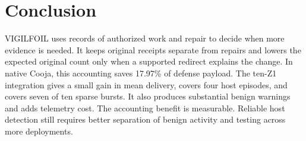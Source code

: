 \documentclass[journal]{IEEEtran}
\begin{document}
\section{Conclusion}
VIGILFOIL uses records of authorized work and repair to decide when more evidence is needed. It keeps original receipts separate from repairs and lowers the expected original count only when a supported redirect explains the change. In native Cooja, this accounting saves 17.97\% of defense payload. The ten-Z1 integration gives a small gain in mean delivery, covers four host episodes, and covers seven of ten sparse bursts. It also produces substantial benign warnings and adds telemetry cost. The accounting benefit is measurable. Reliable host detection still requires better separation of benign activity and testing across more deployments.



\end{document}
